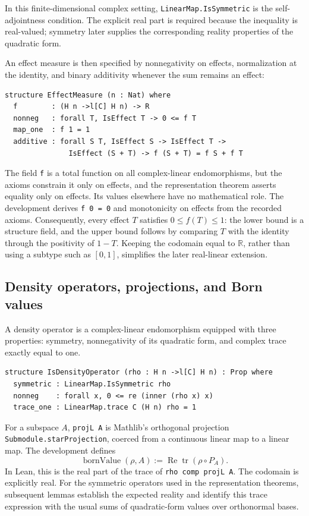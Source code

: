 \documentclass[pdflatex,sn-mathphys-num]{sn-jnl}
\providecommand{\passthrough}[1]{#1}
\theoremstyle{thmstyleone}
\theoremstyle{thmstylethree}
\begin{document}
In this finite-dimensional complex setting, \passthrough{\lstinline!LinearMap.IsSymmetric!} is the self-adjointness condition. The explicit real part is required because the inequality is real-valued; symmetry later supplies the corresponding reality properties of the quadratic form.

An effect measure is then specified by nonnegativity on effects, normalization at the identity, and binary additivity whenever the sum remains an effect:

\begin{lstlisting}
structure EffectMeasure (n : Nat) where
  f        : (H n ->l[C] H n) -> R
  nonneg   : forall T, IsEffect T -> 0 <= f T
  map_one  : f 1 = 1
  additive : forall S T, IsEffect S -> IsEffect T ->
               IsEffect (S + T) -> f (S + T) = f S + f T
\end{lstlisting}

The field \passthrough{\lstinline!f!} is a total function on all complex-linear endomorphisms, but the axioms constrain it only on effects, and the representation theorem asserts equality only on effects. Its values elsewhere have no mathematical role. The development derives \passthrough{\lstinline!f 0 = 0!} and monotonicity on effects from the recorded axioms. Consequently, every effect \(T\) satisfies \(0\leq f(T)\leq1\): the lower bound is a structure field, and the upper bound follows by comparing \(T\) with the identity through the positivity of \(1-T\). Keeping the codomain equal to \(\mathbb R\), rather than using a subtype such as \([0,1]\), simplifies the later real-linear extension.

\subsection{Density operators, projections, and Born values}\label{density-operators-projections-and-born-values}

A density operator is a complex-linear endomorphism equipped with three properties: symmetry, nonnegativity of its quadratic form, and complex trace exactly equal to one.

\begin{lstlisting}
structure IsDensityOperator (rho : H n ->l[C] H n) : Prop where
  symmetric : LinearMap.IsSymmetric rho
  nonneg    : forall x, 0 <= re (inner (rho x) x)
  trace_one : LinearMap.trace C (H n) rho = 1
\end{lstlisting}

For a subspace \(A\), \passthrough{\lstinline!projL A!} is Mathlib's orthogonal projection \passthrough{\lstinline!Submodule.starProjection!}, coerced from a continuous linear map to a linear map. The development defines \[\operatorname{bornValue}(\rho,A)
  := \operatorname{Re}\operatorname{tr}(\rho\circ P_A).\] In Lean, this is the real part of the trace of \passthrough{\lstinline!rho comp projL A!}. The codomain is explicitly real. For the symmetric operators used in the representation theorems, subsequent lemmas establish the expected reality and identify this trace expression with the usual sums of quadratic-form values over orthonormal bases.
\end{document}
